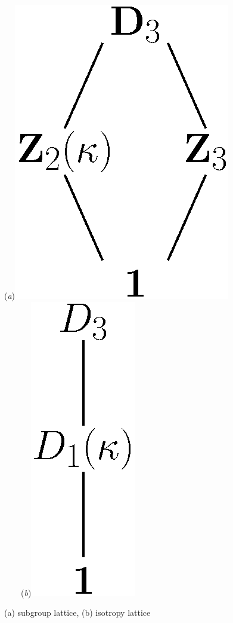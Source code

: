 \begin{example}
\begin{figure}
\begin{center}
  (\textit{a})\includegraphics[height=0.15\textheight]{../figs/D3lattice}
~~~~(\textit{b})\includegraphics[height=0.15\textheight]{../figs/D3stablattice}
\end{center}
\caption[ lattices]{
    {\small
    (a)  subgroup lattice, (b)  isotropy lattice}}
\label{fig:D3lattice}
    \vspace*{-5pt}
\end{figure}


\end{example}
